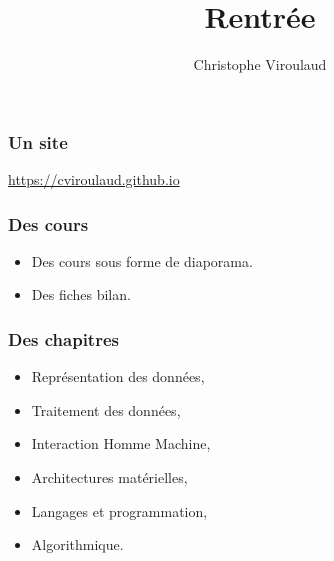 \documentclass[svgnames,11pt]{beamer}
\author[]{Christophe Viroulaud}
\title{Rentrée}
\date{}
\institute{Première - NSI}
\begin{document}
\begin{frame}
\titlepage
\end{frame}
\begin{frame}
    \frametitle{Un site}

\begin{center}
    {\LARGE \url{https://cviroulaud.github.io}}
\end{center}
\end{frame}
\begin{frame}
    \frametitle{Des cours}

    
    \begin{itemize}
        \item Des cours sous forme de diaporama.
        \item Des fiches bilan.
    \end{itemize}

\end{frame}
\begin{frame}
    \frametitle{Des chapitres}

    \begin{itemize}
        \item Représentation des données,
        \item Traitement des données,
        \item Interaction Homme Machine,
        \item Architectures matérielles,
        \item Langages et programmation,
        \item Algorithmique.
    \end{itemize}

\end{frame}
\end{document}
